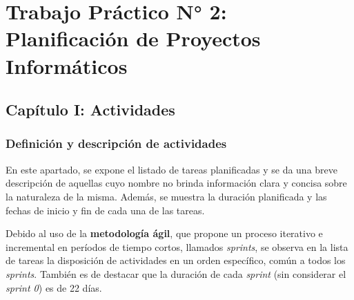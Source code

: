 \section{Trabajo Práctico N° 2: Planificación de Proyectos Informáticos}
\subsection{Capítulo I: Actividades}
\subsubsection{Definición y descripción de actividades}
En este apartado, se expone el listado de tareas planificadas y se da una breve descripción de aquellas cuyo nombre no brinda información clara y concisa sobre la naturaleza de la misma.
Además, se muestra la duración planificada y las fechas de inicio y fin de cada una de las tareas.

Debido al uso de la \textbf{metodología ágil}, que propone un proceso iterativo e incremental en períodos de tiempo cortos, llamados \textit{sprints}, se observa en la lista de tareas la disposición de actividades en un orden específico, común a todos los \textit{sprints}.
También es de destacar que la duración de cada \textit{sprint} (sin considerar el \textit{sprint 0}) es de 22 días.

